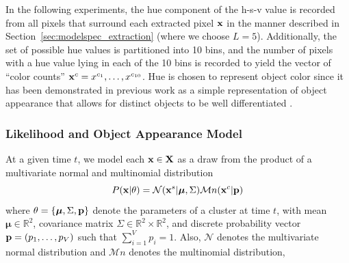 \documentclass[twocolumn, final]{svjour3}
\begin{document}
In the following experiments, the hue component of the h-s-v value is recorded from all pixels that surround each extracted pixel $\bold{x}$ in the manner described in Section~\ref{sec:modelspec_extraction} (where we choose $L=5$). Additionally, the set of possible hue values is partitioned into 10 bins, and the number of pixels with a hue value lying in each of the 10 bins is recorded to yield the vector of ``color counts'' $\bold{x}^{c} = x^{c_{1}}, \ldots, x^{c_{10}}$. Hue is chosen to represent object color since it has been demonstrated in previous work as a simple representation of object appearance that allows for distinct objects to be well differentiated \cite{perez_2002, raja_1998, mckenna_1999}.






\subsubsection{Likelihood and Object Appearance Model}

At a given time $t$, we model each $\bold{x} \in \bold{X}$ as a draw from the product of a multivariate normal and multinomial distribution
\begin{equation}
\label{likelihood}
P(\bold{x}|\theta) = \mathcal{N}(\bold{x}^{s} | \boldsymbol{\mu}, \Sigma)  \mathcal{M}n(\bold{x}^{c} | \bold{p})
\end{equation}
where $\theta = \{ \boldsymbol{\mu}, \Sigma, \bold{p} \}$ denote the parameters of a cluster at time $t$, with mean $\boldsymbol{\mu} \in \mathbb{R}^{2}$, covariance matrix $\Sigma \in \mathbb{R}^{2} \times \mathbb{R}^{2}$, and discrete probability vector $\bold{p} = (p_{1}, \ldots, p_{V})$ such that $\sum_{i=1}^{V}p_{i} = 1$. Also, $\mathcal{N}$ denotes the multivariate normal distribution and $\mathcal{M}n$ denotes the multinomial distribution, 
\end{document}
